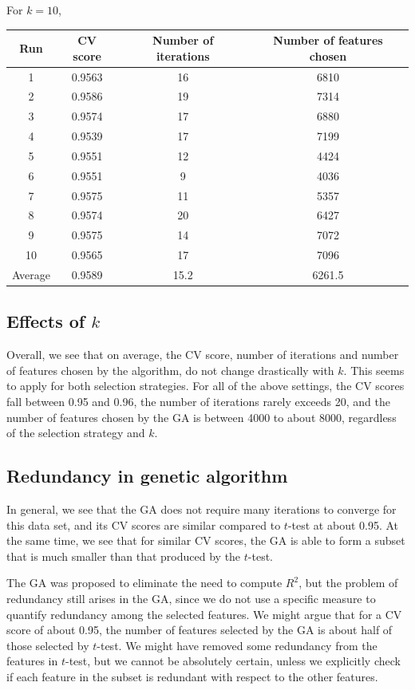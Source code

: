 \documentclass[12pt, twoside, a4paper]{report}
\begin{document}
For $k=10$,
\begin{center}
    \begin{tabular}{| c | c | c | c | } \hline
    Run & CV score & Number of iterations & Number of features chosen \\ \hline \hline
    1 & 0.9563 & 16 & 6810 \\ \hline
	2 & 0.9586 & 19 & 7314 \\ \hline
	3 & 0.9574 & 17 & 6880 \\ \hline
	4 & 0.9539 & 17 & 7199 \\ \hline
	5 & 0.9551 & 12 & 4424 \\ \hline
	6 & 0.9551 & 9 & 4036 \\ \hline
	7 & 0.9575 & 11 & 5357 \\ \hline
	8 & 0.9574 & 20 & 6427 \\ \hline
	9 & 0.9575 & 14 & 7072 \\ \hline
	10 & 0.9565 & 17 & 7096 \\ \hline
	Average & 0.9589 & 15.2 & 6261.5 \\ \hline
    \end{tabular}
\end{center}


\subsection{Effects of $k$}
Overall, we see that on average, the CV score, number of iterations and number of features chosen by the algorithm, do not change drastically with $k$. This seems to apply for both selection strategies. For all of the above settings, the CV scores fall between 0.95 and 0.96, the number of iterations rarely exceeds 20, and the number of features chosen by the GA is between 4000 to about 8000, regardless of the selection strategy and $k$.

\subsection{Redundancy in genetic algorithm}

In general, we see that the GA does not require many iterations to converge for this data set, and its CV scores are similar compared to $t$-test at about 0.95. At the same time, we see that for similar CV scores, the GA is able to form a subset that is much smaller than that produced by the $t$-test.

The GA was proposed to eliminate the need to compute $R^2$, but the problem of redundancy still arises in the GA, since we do not use a specific measure to quantify redundancy among the selected features. We might argue that for a CV score of about 0.95, the number of features selected by the GA is about half of those selected by $t$-test. We might have removed some redundancy from the features in $t$-test, but we cannot be absolutely certain, unless we explicitly check if each feature in the subset is redundant with respect to the other features.
\end{document}
